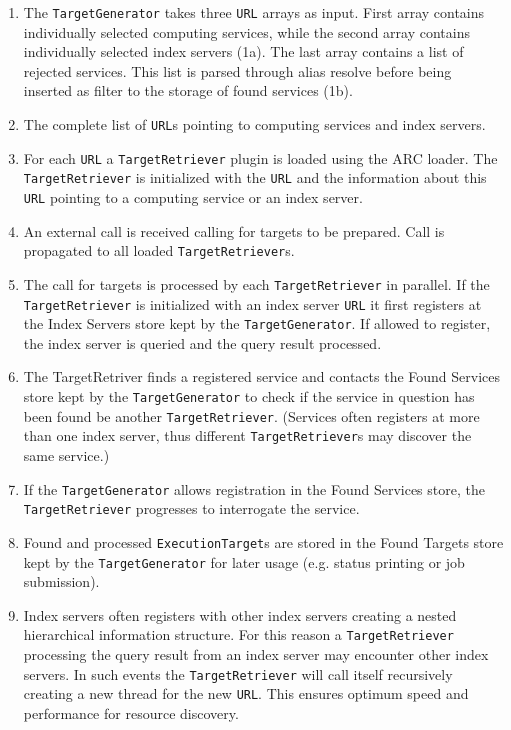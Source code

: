 \documentclass{book}
\newcommand{\TargetGenerator}{\texttt{TargetGenerator}}
\newcommand{\TargetRetriever}{\texttt{TargetRetriever}}
\newcommand{\ExecutionTarget}{\texttt{ExecutionTarget}}
\newcommand{\URL}{\texttt{URL}}
\begin{document}
\begin{enumerate}
\item{The {\TargetGenerator} takes three {\URL} arrays as input. First array contains individually selected computing services, while the 
second array contains individually selected index servers (1a). The last array contains a list of rejected services. This 
list is parsed through alias resolve before being inserted as filter to the storage of found services (1b).}
\item{The complete list of {\URL}s pointing to computing services and index servers.}
\item{For each {\URL} a {\TargetRetriever} plugin is loaded using the ARC loader. The {\TargetRetriever} is initialized 
with the {\URL} and the information about this {\URL} pointing to a computing service or an index server.}
\item{An external call is received calling for targets to be prepared. Call is propagated to all loaded {\TargetRetriever}s.}
\item{The call for targets is processed by each {\TargetRetriever} in parallel. If the {\TargetRetriever} is initialized with an 
index server {\URL} it first registers at the Index Servers store kept by the {\TargetGenerator}. If allowed to register, the index 
server is queried and the query result processed.}
\item{The TargetRetriver finds a registered service and contacts the Found Services store kept by the {\TargetGenerator} to check 
if the service in question has been found be another {\TargetRetriever}. (Services often registers at more than one index server, 
thus different {\TargetRetriever}s may discover the same service.)}
\item{If the {\TargetGenerator} allows registration in the Found Services store, the {\TargetRetriever} progresses to interrogate the service.}
\item{Found and processed {\ExecutionTarget}s are stored in the Found Targets store kept by the {\TargetGenerator} for later usage 
(e.g. status printing or job submission).}
\item{Index servers often registers with other index servers creating a nested hierarchical information structure. For this 
reason a {\TargetRetriever} processing the query result from an index server may encounter other index servers. In such
events the {\TargetRetriever} will call itself recursively creating a new thread for the new {\URL}. This ensures optimum speed and 
performance for resource discovery.}
\end{enumerate}
\end{document}
